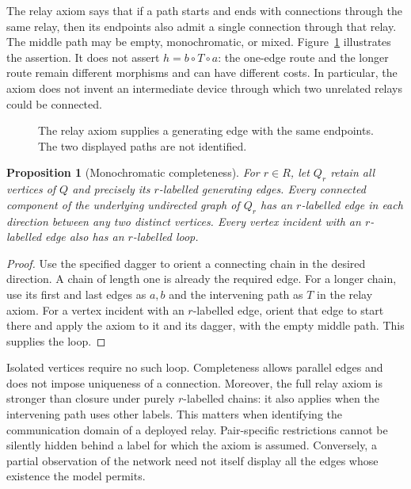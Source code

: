 \documentclass[11pt,a4paper]{article}
\theoremstyle{definition}
\theoremstyle{plain}
\newtheorem{proposition}[definition]{Proposition}
\begin{document}
The relay axiom says that if a path starts and ends with connections
through the same relay, then its endpoints also admit a single
connection through that relay. The middle path may be empty, monochromatic,
or mixed. Figure~\ref{fig:relay} illustrates the assertion. It does not
assert $h=b\circ T\circ a$: the one-edge route and the longer route
remain different morphisms and can have different costs. In particular,
the axiom does not invent an intermediate device through which two
unrelated relays could be connected.

\begin{figure}[htbp]
\centering
{}
\caption{The relay axiom supplies a generating edge with the same
endpoints. The two displayed paths are not identified.}
\label{fig:relay}
\end{figure}

\begin{proposition}[Monochromatic completeness]
\label{prop:complete}
For $r\in R$, let $Q_r$ retain all vertices of $Q$ and precisely its
$r$-labelled generating edges. Every connected component of the
underlying undirected graph of $Q_r$ has an $r$-labelled edge in each
direction between any two distinct vertices. Every vertex incident
with an $r$-labelled edge also has an $r$-labelled loop.
\end{proposition}
\begin{proof}
Use the specified dagger to orient a connecting chain in the desired
direction. A chain of length one is already the required edge. For a
longer chain, use its first and last edges as $a,b$ and the intervening
path as $T$ in the relay axiom. For a vertex incident with an
$r$-labelled edge, orient that edge to start there and apply the axiom
to it and its dagger, with the empty middle path. This supplies the loop.
\end{proof}

Isolated vertices require no such loop. Completeness allows parallel
edges and does not impose uniqueness of a connection. Moreover, the
full relay axiom is stronger than closure under purely $r$-labelled
chains: it also applies when the intervening path uses other labels.
This matters when identifying the communication domain of a deployed
relay. Pair-specific restrictions cannot be silently hidden behind a
label for which the axiom is assumed. Conversely, a partial observation
of the network need not itself display all the edges whose existence
the model permits.
\end{document}
